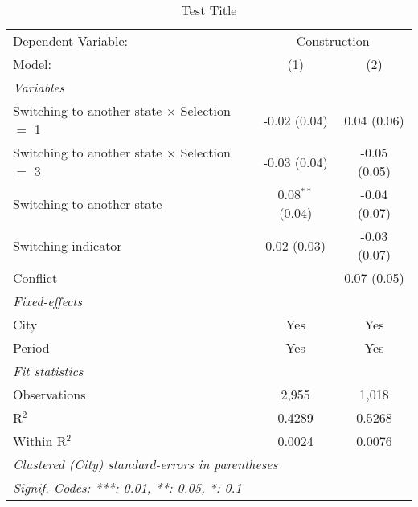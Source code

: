 \begin{table}[htbp]
   \caption{\label{tab:baseline_100y} Test Title}
   \centering
   \begin{tabular}{lcc}
      \tabularnewline \midrule \midrule
      Dependent Variable: & \multicolumn{2}{c}{Construction}\\
      Model:                                               & (1)                & (2)\\  
      \midrule
      \emph{Variables}\\
      Switching to another state $\times$ Selection $=$ 1  & -0.02 (0.04)       & 0.04 (0.06)\\   
      Switching to another state $\times$ Selection $=$ 3  & -0.03 (0.04)       & -0.05 (0.05)\\   
      Switching to another state                           & 0.08$^{**}$ (0.04) & -0.04 (0.07)\\   
      Switching indicator                                  & 0.02 (0.03)        & -0.03 (0.07)\\   
      Conflict                                             &                    & 0.07 (0.05)\\   
      \midrule
      \emph{Fixed-effects}\\
      City                                                 & Yes                & Yes\\  
      Period                                               & Yes                & Yes\\  
      \midrule
      \emph{Fit statistics}\\
      Observations                                         & 2,955              & 1,018\\  
      R$^2$                                                & 0.4289             & 0.5268\\  
      Within R$^2$                                         & 0.0024             & 0.0076\\  
      \midrule \midrule
      \multicolumn{3}{l}{\emph{Clustered (City) standard-errors in parentheses}}\\
      \multicolumn{3}{l}{\emph{Signif. Codes: ***: 0.01, **: 0.05, *: 0.1}}\\
   \end{tabular}
\end{table}

